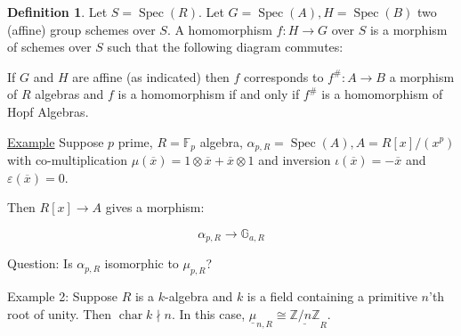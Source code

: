 \documentclass{article}
\theoremstyle{definition}
\newtheorem*{definition}{Definition}
\numberwithin{theorem}{subsection}
\begin{document}
    \begin{definition}
        Let \(S = \operatorname{Spec}(R)\). Let \(G = \operatorname{Spec}(A), H = \operatorname{Spec}(B)\) two (affine) group schemes over \(S\). A homomorphism \(f: H \to G\) over \(S\) is a morphism of schemes over \(S\) such that the following diagram commutes:

        \begin{center}
        \end{center}

        If \(G\) and \(H\) are affine (as indicated) then \(f\) corresponds to \(f^\#: A \to B\) a morphism of \(R\) algebras and \(f\) is a homomorphism if and only if \(f^\#\) is a homomorphism of Hopf Algebras. 
    \end{definition}

    \underline{Example} Suppose \(p\) prime, \(R = \mathbb{F}_p\) algebra, \(\alpha_{p,R} = \operatorname{Spec}(A), A = R[x] / (x^p)\) with co-multiplication \(\mu(\overline{x}) = 1 \otimes \overline{x} + \overline{x} \otimes 1\) and inversion \(\iota(\overline{x}) = - \overline{x}\) and \(\varepsilon(\overline{x}) = 0\).
    
    Then \(R[x] \to A\) gives a morphism:

    \[
        \alpha_{p,R} \to \mathbb{G}_{a,R}
    \]

    Question: Is \(\alpha_{p,R}\) isomorphic to \(\mu_{p,R}\)?

    Example 2: Suppose \(R\) is a \(k\)-algebra and \(k\) is a field containing a primitive \(n\)'th root of unity. Then \(\operatorname{char} k \nmid n\). In this case, \(\underline{\mu}_{n,R} \cong \underline{\mathbb{Z} / n\mathbb{Z}}_R\). 
\end{document}
